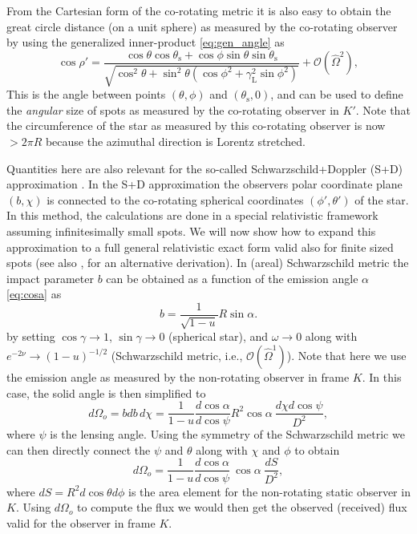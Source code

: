 \documentclass{aa}
\newcommand{\be}{\begin{equation}}
\newcommand{\ee}{\end{equation}}
\newcommand{\sch}{Schwarzschild }
\newcommand{\Ob}{\ensuremath{\hat{\Omega}}}
\newcommand{\lgamma}{\gamma_{\text{L}}}
\begin{document}
From the Cartesian form of the co-rotating metric it is also easy to obtain the great circle distance (on a unit sphere) as measured by the co-rotating observer by using the generalized inner-product \eqref{eq:gen_angle} as
\be\label{eq:rel_cos}
\cos\rho' = \frac{\cos\theta \cos\theta_\mathrm{s} + \cos\phi \sin\theta \sin\theta_{\mathrm{s}}}{\sqrt{ \cos^2\theta + \sin^2\theta (\cos\phi^2 + \lgamma^2 \sin\phi^2)}} + \mathcal{O}(\Ob^2),
\ee
This is the angle between points $(\theta, \phi)$ and $(\theta_{\mathrm{s}}, 0)$, and can be used to define the \textit{angular} size of spots as measured by the co-rotating observer in $K'$.
Note that the circumference of the star as measured by this co-rotating observer is now $>2\pi R$ because the azimuthal direction is Lorentz stretched.

Quantities here are also relevant for the so-called Schwarzschild+Doppler (S+D) approximation \cite[see e.g.,][]{PB06}.
In the S+D approximation the observers polar coordinate plane $(b,\chi)$ is connected to the co-rotating spherical coordinates $(\phi', \theta')$ of the star.
In this method, the calculations are done in a special relativistic framework assuming infinitesimally small spots.
We will now show how to expand this approximation to a full general relativistic exact form valid also for finite sized spots (see also \citealt{CML07}, for an alternative derivation).
In (areal) \sch metric the impact parameter $b$ can be obtained as a function of the emission angle $\alpha$ \eqref{eq:cosa} as
\be
b = \frac{1}{\sqrt{1-u}} R \sin\alpha.
\ee
by setting $\cos\gamma \rightarrow 1$, $\sin\gamma \rightarrow 0$ (spherical star), and $\omega \rightarrow 0$ along with $e^{-2\nu} \rightarrow (1-u)^{-1/2}$ (\sch metric, i.e., $\mathcal{O}(\Ob^1)$).
Note that here we use the emission angle as measured by the non-rotating observer in frame $K$.
In this case, the solid angle is then simplified to 
\be
d\Omega_o = bdb \, d\chi = \frac{1}{1-u} \frac{d \cos\alpha}{d \cos\psi} R^2 \cos\alpha ~ \frac{d\chi d\cos\psi}{D^2},
\ee
where $\psi$ is the lensing angle.
Using the symmetry of the \sch metric we can then directly connect the $\psi$ and $\theta$ along with $\chi$ and $\phi$ to obtain
\be
d\Omega_o = \frac{1}{1-u} \frac{d \cos\alpha}{d \cos\psi} ~\cos\alpha ~ \frac{dS}{D^2},
\ee
where $dS = R^2 d\cos\theta d\phi$ is the area element for the non-rotating static observer in $K$.
Using $d\Omega_o$ to compute the flux we would then get the observed (received) flux valid for the observer in frame $K$.
\end{document}
